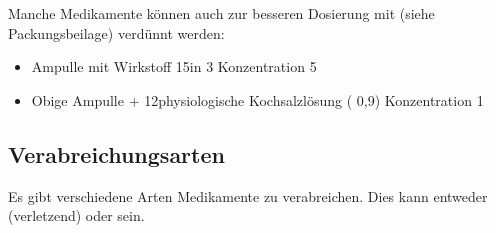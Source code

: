 {Manche Medikamente können auch zur besseren Dosierung
mit  (siehe
Packungsbeilage) verdünnt werden:

\begin{itemize}
  \item Ampulle mit Wirkstoff 15\Mg* in 3\Ml* 
  {\dotfill} Konzentration 5\,\nicefrac{\Mg}{\Ml}
  \item Obige Ampulle 
  + 12\Ml* physiologische Kochsalzlösung 
  ( 0,9\PC) 
  {\dotfill} Konzentration 1\,\nicefrac{\Mg}{\Ml}
\end{itemize}

}
{}
{}
{}
{}


\subsection{Verabreichungsarten}
Es gibt verschiedene Arten Medikamente zu verabreichen. Dies
kann entweder  (verletzend) oder
 sein. 

